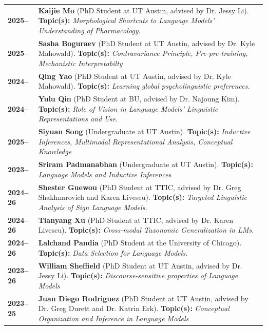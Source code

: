 \documentclass[11pt]{article}
\begin{document}
\begin{longtable}{p{}  p{} }
    \textbf{2025--} & \textbf{Kaijie Mo} (PhD Student at UT Austin, advised by Dr. Jessy Li). \textbf{Topic(s):} \textit{Morphological Shortcuts to Language Models' Understanding of Pharmacology}.\\
    \textbf{2025--} & \textbf{Sasha Boguraev} (PhD Student at UT Austin, advised by Dr. Kyle Mahowald). \textbf{Topic(s):} \textit{Contravariance Principle, Pre-pre-training, Mechanistic Interpretabilty}\\
    \textbf{2024--} & \textbf{Qing Yao} (PhD Student at UT Austin, advised by Dr. Kyle Mahowald). \textbf{Topic(s):} \textit{Learning global psycholinguistic preferences.}\\
    \textbf{2024--} & \textbf{Yulu Qin} (PhD Student at BU, advised by Dr. Najoung Kim). \textbf{Topic(s):} \textit{Role of Vision in Language Models' Linguistic Representations and Use.}\\
    \textbf{2025--} & \textbf{Siyuan Song} (Undergraduate at UT Austin). \textbf{Topic(s):} \textit{Inductive Inferences, Multimodal Representational Analysis, Conceptual Knowledge}\\
    \textbf{2023--} & \textbf{Sriram Padmanabhan} (Undergraduate at UT Austin). \textbf{Topic(s):} \textit{Language Models and Inductive Inferences}\\
    \textbf{2024--26} & \textbf{Shester Guewou} (PhD Student at TTIC, advised by Dr. Greg Shakhnarovich and Karen Livescu). \textbf{Topic(s):} \textit{Targeted Linguistic Analysis of Sign Language Models.}\\
    \textbf{2024--26} & \textbf{Tianyang Xu} (PhD Student at TTIC, advised by Dr. Karen Livescu). \textbf{Topic(s):} \textit{Cross-modal Taxonomic Generalization in LMs.}\\
    \textbf{2024--26} & \textbf{Lalchand Pandia} (PhD Student at the University of Chicago). \textbf{Topic(s):} \textit{Data Selection for Language Models.}\\
    \textbf{2023--26} & \textbf{William Sheffield} (PhD Student at UT Austin, advised by Dr. Jessy Li). \textbf{Topic(s):} \textit{Discourse-sensitive properties of Language Models}\\
    \textbf{2023--25} & \textbf{Juan Diego Rodriguez} (PhD Student at UT Austin, advised by Dr. Greg Durett and Dr. Katrin Erk). \textbf{Topic(s):} \textit{Conceptual Organization and Inference in Language Models}\\

\end{longtable}
\end{document}
